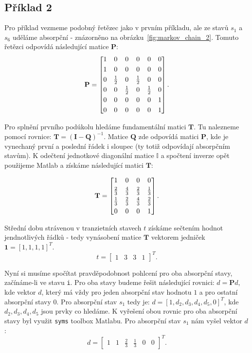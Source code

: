 \documentclass{article}
\begin{document}
\subsection{Příklad 2}
Pro příklad vezmeme podobný řetězec jako v prvním příkladu, ale ze stavů $s_1$ a $s_6$ uděláme absorpční - znázorněno na obrázku~\ref{fig:markov_chain_2}.
Tomuto řetězci odpovídá následující matice $\mathbf{P}$:
\[
\mathbf{P} =
\begin{bmatrix}
1 & 0 & 0 & 0 & 0 & 0 \\
\addlinespace[3pt]
1 & 0 & 0 & 0 & 0 & 0 \\
\addlinespace[3pt]
0 & \frac{1}{2} & 0 & \frac{1}{2} & 0 & 0 \\
\addlinespace[3pt]
0 & 0 & \frac{1}{2} & 0 & \frac{1}{2} & 0 \\
\addlinespace[3pt]
0 & 0 & 0 & 0 & 0 & 1 \\
\addlinespace[3pt]
0 & 0 & 0 & 0 & 0 & 1 \\
\end{bmatrix}.
\]

Pro splnění prvního podúkolu hledáme fundamentální matici $\mathbf{T}$. Tu nalezneme pomocí rovnice: $\mathbf{T}=(\mathbf{I}-\mathbf{Q})^{-1}$. Matice $\mathbf{Q}$ zde odpovídá matici $\mathbf{P}$, kde je vynechaný první a poslední řádek i sloupec (ty totiž odpovídají absorpčním stavům).
K odečtení jednotkové diagonální matice $\mathbb{I}$ a spočtení inverze opět použijeme Matlab a získáme následující matici $\mathbf{T}$:



\[
\mathbf{T} =
\begin{bmatrix}
1 & 0 & 0 & 0 \\
\addlinespace[3pt]
\frac{2}{3} & \frac{4}{3} & \frac{2}{3} & \frac{1}{3} \\
\addlinespace[3pt]
\frac{1}{3} & \frac{2}{3} & \frac{4}{3} & \frac{2}{3} \\
\addlinespace[3pt]
0 & 0 & 0 & 1 \\
\end{bmatrix}.
\]

Střední dobu strávenou v tranzietních stavech $t$ získáme sečtením hodnot jendnotlivých řádků - tedy vynásobení matice $\mathbf{T}$ vektorem jedniček $\mathbf{1} = [1, 1, 1, 1]^T$.
\[
t = 
\begin{bmatrix}
    1 & 3 & 3 & 1
\end{bmatrix}^T.
\]

Nyní si musíme spočítat pravděpodobnost pohlcení pro oba absorpční stavy, začínáme-li ve stavu \verb|i|.
Pro oba stavy budeme řešit následující rovnici: $d = \mathbf{P} d$, kde vektor $d$, který má vždy pro jeden absorpční stav hodnotu $1$ a pro ostatní absorpční stavy $0$. 
Pro absorpční stav $s_1$ tedy je: $d = [1, d_2, d_3, d_4, d_5, 0]^T$, kde $d_2, d_3, d_4, d_5$ jsou prvky co hledáme.
K vyřešení obou rovnic pro oba absorpční stavy byl využit \verb|syms| toolbox Matlabu.
Pro absorpční stav $s_1$ nám vyšel vektor $d$:
\[
d = 
\begin{bmatrix}
    1 & 1 &\frac 2 3 & \frac 1 3 & 0 & 0
\end{bmatrix}^T.
\]
\end{document}
